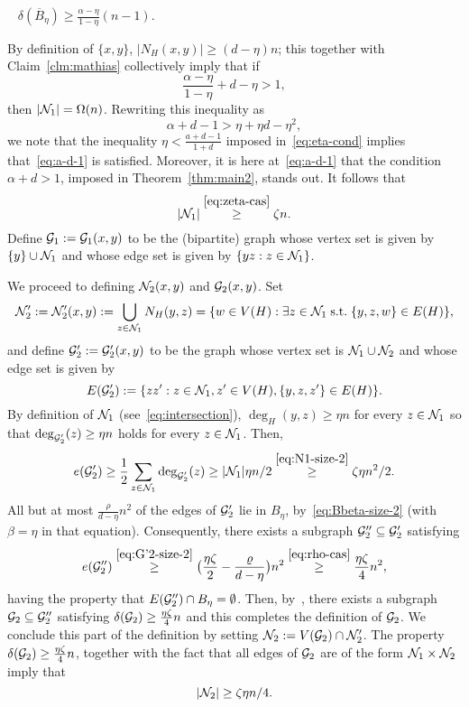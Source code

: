 \documentclass[11pt,reqno]{amsart}
\begin{document}
\begin{claim}\label{clm:mathias}{\em~\cite[Claim~3.1]{Mathias3}}
$\delta(\overline{B}_\eta) \geq \frac{\alpha-\eta}{1-\eta}(n-1)$.
\end{claim}
 
\noindent
By definition of $\{x,y\}$, $|N_H(x,y)| \geq (d-\eta)n$; this together with Claim~\ref{clm:mathias} collectively imply that if 
$$
\frac{\alpha -\eta}{1-\eta} + d-\eta > 1, 
$$
then $|\mathcal{N}_1|=\Omega(n)$. 
Rewriting this inequality as 
\begin{equation}\label{eq:a-d-1}
\alpha +d - 1 > \eta +\eta d - \eta^2,
\end{equation}
we note that the inequality $\eta < \frac{a+d-1}{1+d}$ imposed in~\eqref{eq:eta-cond} implies that~\eqref{eq:a-d-1} is satisfied. Moreover, it is here at~\eqref{eq:a-d-1} that the condition $\alpha +d > 1$, imposed in Theorem~\ref{thm:main2}, stands out. 
It follows that 
\begin{equation}\label{eq:N1-size-2}
|\mathcal{N}_1| \overset{\eqref{eq:zeta-cas}}{\geq} \zeta n.
\end{equation}
Define $\mathcal{G}_1 := \mathcal{G}_1(x,y)$ to be the (bipartite) graph whose vertex set is given by $\{y\} \cup \mathcal{N}_1$ and whose edge set is given by $\{yz : z \in \mathcal{N}_1\}$. \vspace{1em}

We proceed to defining $\mathcal{N}_2(x,y)$ and $\mathcal{G}_2(x,y)$. Set 
$$
\mathcal{N}'_2 := \mathcal{N}'_2(x,y) := \bigcup_{z \in \mathcal{N}_1} N_H(y,z) = \{w \in V(H): \exists z \in \mathcal{N}_1\; \text{s.t.}\; \{y,z,w\} \in E(H)\},
$$
and define $\mathcal{G}'_2:= \mathcal{G}'_2(x,y)$ to be the graph whose vertex set is $\mathcal{N}_1 \cup \mathcal{N}_2$ and whose edge set is given by 
$$
E(\mathcal{G}'_2) := \{zz': z \in \mathcal{N}_1, z' \in V(H), \{y,z,z'\} \in E(H)\}.
$$
By definition of $\mathcal{N}_1$ (see~\eqref{eq:intersection}), $\deg_H(y,z) \geq \eta n$ for every $z \in \mathcal{N}_1$ so that $\deg_{\mathcal{G}'_2}(z) \geq \eta n$ holds for every $z\in \mathcal{N}_1$. Then, 
\begin{equation}\label{eq:G'2-size-2}
e(\mathcal{G}'_2) \geq \frac{1}{2} \sum_{z \in \mathcal{N}_1} \deg_{\mathcal{G}'_2}(z) \geq |\mathcal{N}_1| \eta n /2 \overset{\eqref{eq:N1-size-2}}{\geq} \zeta \eta n^2 /2. 
\end{equation}
All but at most $\frac{\rho}{d-\eta}n^2$ of the edges of $\mathcal{G}'_2$ lie in $B_\eta$, by~\eqref{eq:Bbeta-size-2} (with $\beta = \eta$ in that equation). Consequently, there exists a subgraph $\mathcal{G}''_2 \subseteq \mathcal{G}'_2$ satisfying 
$$
e(\mathcal{G}''_2) \overset{\eqref{eq:G'2-size-2}}{\geq} \big(\frac{\eta \zeta}{2} - \frac{\varrho}{d-\eta}\big) n^2 \overset{\eqref{eq:rho-cas}}{\geq} \frac{\eta\zeta}{4}n^2,
$$
having the property that $E(\mathcal{G}''_2) \cap B_\eta =\emptyset$. Then, by~\cite[Proposition~1.2.2]{Diestel}, there exists a subgraph $\mathcal{G}_2 \subseteq \mathcal{G}''_2$ satisfying $\delta(\mathcal{G}_2) \geq \frac{\eta\zeta}{4}n$ and this completes the definition of $\mathcal{G}_2$. We conclude this part of the definition by setting $\mathcal{N}_2 := V(\mathcal{G}_2) \cap \mathcal{N}'_2$. The property $\delta(\mathcal{G}_2) \geq \frac{\eta\zeta}{4}n$, together with the fact that all edges of $\mathcal{G}_2$ are of the form $\mathcal{N}_1 \times \mathcal{N}_2$ imply that 
\begin{equation}\label{eq:N2-size-2}
|\mathcal{N}_2| \geq \zeta \eta n/4.  
\end{equation}
\end{document}
